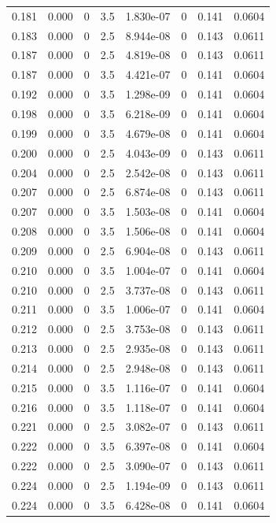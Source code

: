 \documentclass[preview]{standalone}
\begin{document}
{{{\begin{tabular}{L{1.2cm}C{1.2cm} C{0.3cm}C{0.5cm} C{1.4cm}C{1.4cm} C{1.4cm}C{1.4cm}}
  0.181  &  0.000  & 0     & 3.5 &  1.830e-07  & 0  & 0.141 &  0.0604   \\ 
  0.183  &  0.000  & 0     & 2.5 &  8.944e-08  & 0  & 0.143 &  0.0611   \\ 
  0.187  &  0.000  & 0     & 2.5 &  4.819e-08  & 0  & 0.143 &  0.0611   \\ 
  0.187  &  0.000  & 0     & 3.5 &  4.421e-07  & 0  & 0.141 &  0.0604   \\ 
  0.192  &  0.000  & 0     & 3.5 &  1.298e-09  & 0  & 0.141 &  0.0604   \\ 
  0.198  &  0.000  & 0     & 3.5 &  6.218e-09  & 0  & 0.141 &  0.0604   \\ 
  0.199  &  0.000  & 0     & 3.5 &  4.679e-08  & 0  & 0.141 &  0.0604   \\ 
  0.200  &  0.000  & 0     & 2.5 &  4.043e-09  & 0  & 0.143 &  0.0611   \\ 
  0.204  &  0.000  & 0     & 2.5 &  2.542e-08  & 0  & 0.143 &  0.0611   \\ 
  0.207  &  0.000  & 0     & 2.5 &  6.874e-08  & 0  & 0.143 &  0.0611   \\ 
  0.207  &  0.000  & 0     & 3.5 &  1.503e-08  & 0  & 0.141 &  0.0604   \\ 
  0.208  &  0.000  & 0     & 3.5 &  1.506e-08  & 0  & 0.141 &  0.0604   \\ 
  0.209  &  0.000  & 0     & 2.5 &  6.904e-08  & 0  & 0.143 &  0.0611   \\ 
  0.210  &  0.000  & 0     & 3.5 &  1.004e-07  & 0  & 0.141 &  0.0604   \\ 
  0.210  &  0.000  & 0     & 2.5 &  3.737e-08  & 0  & 0.143 &  0.0611   \\ 
  0.211  &  0.000  & 0     & 3.5 &  1.006e-07  & 0  & 0.141 &  0.0604   \\ 
  0.212  &  0.000  & 0     & 2.5 &  3.753e-08  & 0  & 0.143 &  0.0611   \\ 
  0.213  &  0.000  & 0     & 2.5 &  2.935e-08  & 0  & 0.143 &  0.0611   \\ 
  0.214  &  0.000  & 0     & 2.5 &  2.948e-08  & 0  & 0.143 &  0.0611   \\ 
  0.215  &  0.000  & 0     & 3.5 &  1.116e-07  & 0  & 0.141 &  0.0604   \\ 
  0.216  &  0.000  & 0     & 3.5 &  1.118e-07  & 0  & 0.141 &  0.0604   \\ 
  0.221  &  0.000  & 0     & 2.5 &  3.082e-07  & 0  & 0.143 &  0.0611   \\ 
  0.222  &  0.000  & 0     & 3.5 &  6.397e-08  & 0  & 0.141 &  0.0604   \\ 
  0.222  &  0.000  & 0     & 2.5 &  3.090e-07  & 0  & 0.143 &  0.0611   \\ 
  0.224  &  0.000  & 0     & 2.5 &  1.194e-09  & 0  & 0.143 &  0.0611   \\ 
  0.224  &  0.000  & 0     & 3.5 &  6.428e-08  & 0  & 0.141 &  0.0604   \\ 
\hline 
\end{tabular} 

}}}
\end{document}
